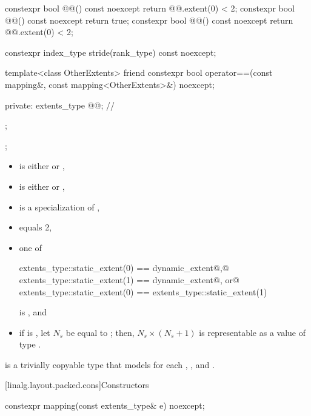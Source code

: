 \begin{codeblock}
{{{      constexpr bool @@() const noexcept {
        return @@.extent(0) < 2;
      }
      constexpr bool @@() const noexcept { return true; }
      constexpr bool @@() const noexcept {
        return @@.extent(0) < 2;
      }

      constexpr index_type stride(rank_type) const noexcept;

      template<class OtherExtents>
        friend constexpr bool operator==(const mapping&, const mapping<OtherExtents>&) noexcept;

    private:
      extents_type @@{};     // \expos
    };
  };
}
\end{codeblock}

\begin{itemdescr}
\pnum
\mandates
\begin{itemize}
\item
{} is either  or ,
\item
{} is either  or ,
\item
{} is a specialization of ,
\item
{} equals 2,
\item
one of
\begin{codeblock}
extents_type::static_extent(0) == dynamic_extent@\textrm{,}@
extents_type::static_extent(1) == dynamic_extent@\textrm{, or}@
extents_type::static_extent(0) == extents_type::static_extent(1)
\end{codeblock}
is , and
\item
if  is ,
let $N_s$ be equal to ; then,
$N_s \times (N_s + 1)$ is representable as a value of type .
\end{itemize}

\pnum
{} is a trivially copyable type
that models  for each , , and .
\end{itemdescr}

[linalg.layout.packed.cons]{Constructors}

%
\begin{itemdecl}
constexpr mapping(const extents_type& e) noexcept;
\end{itemdecl}

